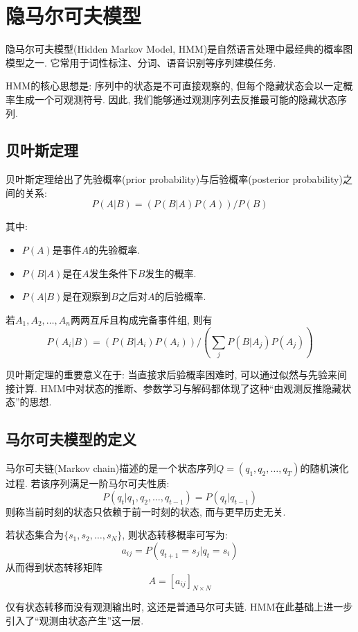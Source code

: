 \chapter{隐马尔可夫模型}


隐马尔可夫模型(Hidden Markov Model, HMM)是自然语言处理中最经典的概率图模型之一.
它常用于词性标注、分词、语音识别等序列建模任务.

HMM的核心思想是: 序列中的状态是不可直接观察的, 但每个隐藏状态会以一定概率生成一个可观测符号.
因此, 我们能够通过观测序列去反推最可能的隐藏状态序列.

\section{贝叶斯定理}


贝叶斯定理给出了先验概率(prior probability)与后验概率(posterior probability)之间的关系:
\[
P(A|B) = (P(B|A) P(A)) / P(B)
\]

其中:

\begin{itemize}
\item $P(A)$是事件$A$的先验概率.
\item $P(B|A)$是在$A$发生条件下$B$发生的概率.
\item $P(A|B)$是在观察到$B$之后对$A$的后验概率.
\end{itemize}

若$A_1, A_2, \dots, A_n$两两互斥且构成完备事件组, 则有
\[
P(A_i|B) = (P(B|A_i) P(A_i)) / (\sum_j P(B|A_j) P(A_j))
\]

贝叶斯定理的重要意义在于: 当直接求后验概率困难时, 可以通过似然与先验来间接计算.
HMM中对状态的推断、参数学习与解码都体现了这种“由观测反推隐藏状态”的思想.

\section{马尔可夫模型的定义}


马尔可夫链(Markov chain)描述的是一个状态序列$Q = (q_1, q_2, \dots, q_T)$的随机演化过程.
若该序列满足一阶马尔可夫性质:
\[
P(q_t | q_1, q_2, \dots, q_{t-1}) = P(q_t | q_{t-1})
\]
则称当前时刻的状态只依赖于前一时刻的状态, 而与更早历史无关.

若状态集合为$\{s_1, s_2, \dots, s_N\}$, 则状态转移概率可写为:
\[
a_{i j} = P(q_{t+1} = s_j | q_t = s_i)
\]
从而得到状态转移矩阵
\[
A = [a_{i j}]_{N \times N}
\]

仅有状态转移而没有观测输出时, 这还是普通马尔可夫链.
HMM在此基础上进一步引入了“观测由状态产生”这一层.

